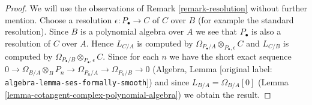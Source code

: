 \documentclass[10pt,a4paper]{article}
\theoremstyle{plain}
\theoremstyle{definition}
\theoremstyle{remark}
\numberwithin{equation}{subsection}
\begin{document}
\begin{proof}
We will use the observations of Remark \ref{remark-resolution}
without further mention. Choose a resolution $\epsilon : P_\bullet \to C$
of $C$ over $B$ (for example the standard resolution). Since $B$ is a
polynomial algebra over $A$ we see that $P_\bullet$ is also a resolution of
$C$ over $A$. Hence $L_{C/A}$ is computed by
$\Omega_{P_\bullet/A} \otimes_{P_\bullet, \epsilon} C$
and $L_{C/B}$ is computed by
$\Omega_{P_\bullet/B} \otimes_{P_\bullet, \epsilon} C$.
Since for each $n$ we have the short exact sequence
$0 \to \Omega_{B/A} \otimes_B P_n \to \Omega_{P_n/A} \to \Omega_{P_n/B} \to 0$
(Algebra, Lemma \textnormal{[original label: \nolinkurl{algebra-lemma-ses-formally-smooth}]})
and since $L_{B/A} = \Omega_{B/A}[0]$
(Lemma \ref{lemma-cotangent-complex-polynomial-algebra})
we obtain the result.
\end{proof}
\end{document}
